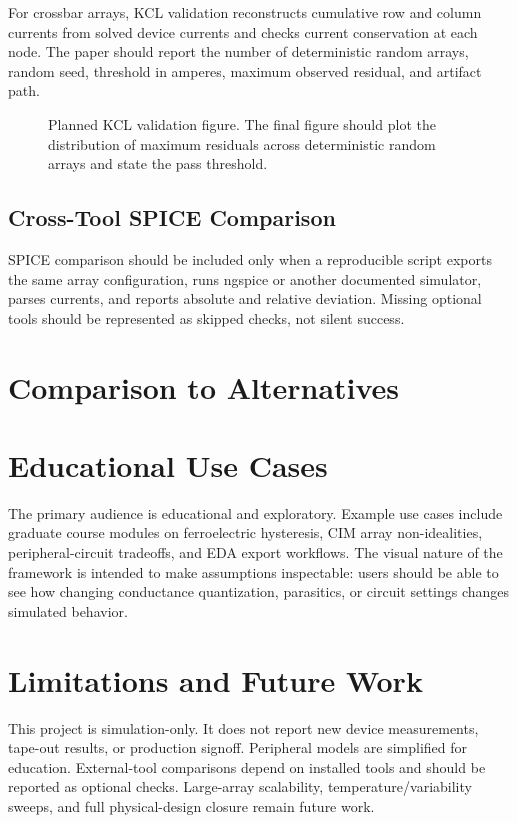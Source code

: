 \documentclass[11pt]{article}
\newcommand{\figplaceholder}[2]{%
  \begin{figure}[ht]
    \centering
    \fbox{\begin{minipage}[c][1.6in][c]{0.88\linewidth}
      \centering #1
    \end{minipage}}
    \caption{#2}
  \end{figure}
}
\begin{document}
For crossbar arrays, KCL validation reconstructs cumulative row and column currents from solved device currents and checks current conservation at each node. The paper should report the number of deterministic random arrays, random seed, threshold in amperes, maximum observed residual, and artifact path.

\figplaceholder{KCL residual plot placeholder}{Planned KCL validation figure. The final figure should plot the distribution of maximum residuals across deterministic random arrays and state the pass threshold.}

\subsection{Cross-Tool SPICE Comparison}

SPICE comparison should be included only when a reproducible script exports the same array configuration, runs ngspice or another documented simulator, parses currents, and reports absolute and relative deviation. Missing optional tools should be represented as skipped checks, not silent success.

\section{Comparison to Alternatives}



\section{Educational Use Cases}

The primary audience is educational and exploratory. Example use cases include graduate course modules on ferroelectric hysteresis, CIM array non-idealities, peripheral-circuit tradeoffs, and EDA export workflows. The visual nature of the framework is intended to make assumptions inspectable: users should be able to see how changing conductance quantization, parasitics, or circuit settings changes simulated behavior.

\section{Limitations and Future Work}

This project is simulation-only. It does not report new device measurements, tape-out results, or production signoff. Peripheral models are simplified for education. External-tool comparisons depend on installed tools and should be reported as optional checks. Large-array scalability, temperature/variability sweeps, and full physical-design closure remain future work.
\end{document}
